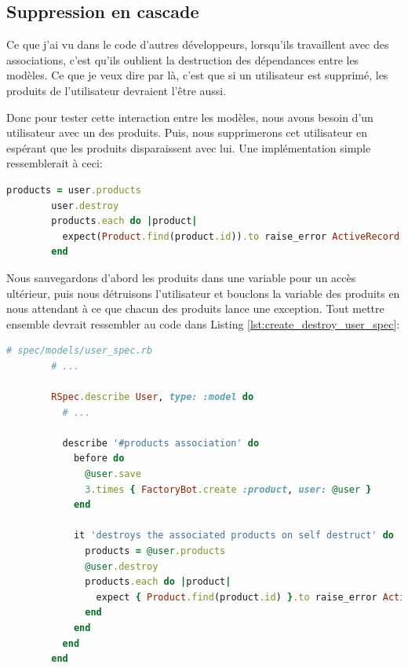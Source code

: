 \documentclass[]{report}
\begin{document}
    \subsection{Suppression en cascade}

      Ce que j'ai vu dans le code d'autres développeurs, lorsqu'ils travaillent avec des associations, c'est qu'ils oublient la destruction des dépendances entre les modèles. Ce que je veux dire par là, c'est que si un utilisateur est supprimé, les produits de l'utilisateur devraient l'être aussi.

      Donc pour tester cette interaction entre les modèles, nous avons besoin d'un utilisateur avec un des produits. Puis, nous supprimerons cet utilisateur en espérant que les produits disparaissent avec lui. Une implémentation simple ressemblerait à ceci:

      \begin{scriptsize}
        \begin{lstlisting}[language=ruby]
        products = user.products
        user.destroy
        products.each do |product|
          expect(Product.find(product.id)).to raise_error ActiveRecord::RecordNotFound
        end
        \end{lstlisting}
      \end{scriptsize}

      Nous sauvegardons d'abord les produits dans une variable pour un accès ultérieur, puis nous détruisons l'utilisateur et bouclons la variable des produits en nous attendant à ce que chacun des produits lance une exception. Tout mettre ensemble devrait ressembler au code dans Listing \ref{lst:create_destroy_user_spec}:

      \begin{scriptsize}
        \begin{lstlisting}[language=ruby, caption={Test de suppression des produits liés aux utilisateurs}, label={lst:create_destroy_user_spec}]
        # spec/models/user_spec.rb
        # ...

        RSpec.describe User, type: :model do
          # ...

          describe '#products association' do
            before do
              @user.save
              3.times { FactoryBot.create :product, user: @user }
            end

            it 'destroys the associated products on self destruct' do
              products = @user.products
              @user.destroy
              products.each do |product|
                expect { Product.find(product.id) }.to raise_error ActiveRecord::RecordNotFound
              end
            end
          end
        end
        \end{lstlisting}
      \end{scriptsize}
\end{document}
